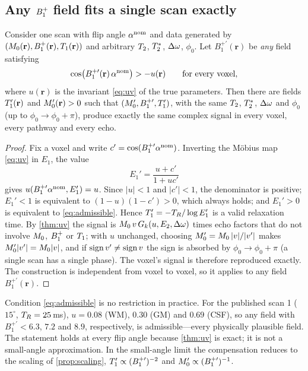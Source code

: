 \subsection{Any $B_1^{+}$ field fits a single scan exactly}

\begin{proposition}\label{prop:singlescan}
Consider one scan with flip angle $\alpha^{\rm nom}$ and data generated by
$(M_0(\mathbf r),B_1^{+}(\mathbf r),T_1(\mathbf r))$ and arbitrary $T_2$, $T_2^{*}$, $\Delta\omega$, $\phi_0$. Let
$B_1^{+\prime}(\mathbf r)$ be \emph{any} field satisfying
\begin{equation}
  \cos\bigl(B_1^{+\prime}(\mathbf r)\,\alpha^{\rm nom}\bigr)>-u(\mathbf r)\qquad\text{for every voxel},
  \label{eq:admissible}
\end{equation}
where $u(\mathbf r)$ is the invariant \eqref{eq:uv} of the true parameters. Then there are fields
$T_1'(\mathbf r)$ and $M_0'(\mathbf r)>0$ such that $(M_0',B_1^{+\prime},T_1')$, with the same $T_2$, $T_2^{*}$, $\Delta\omega$ and
$\phi_0$ (up to $\phi_0\to\phi_0+\pi$), produce exactly the same complex signal in every voxel, every
pathway and every echo.
\end{proposition}
\begin{proof}
Fix a voxel and write $c'=\cos(B_1^{+\prime}\alpha^{\rm nom})$. Inverting the M\"obius map \eqref{eq:uv}
in $E_1$, the value
\[
  E_1'=\frac{u+c'}{1+uc'}
\]
gives $u(B_1^{+\prime}\alpha^{\rm nom},E_1')=u$. Since $|u|<1$ and $|c'|<1$, the denominator is positive;
$E_1'<1$ is equivalent to $(1-u)(1-c')>0$, which always holds; and $E_1'>0$ is equivalent to
\eqref{eq:admissible}. Hence $T_1'=-T_R/\log E_1'$ is a valid relaxation time. By \cref{thm:uv} the
signal is $M_0\,v\,G_k(u,E_2,\Delta\omega)$ times echo factors that do not involve $M_0$, $B_1^{+}$ or $T_1$; with
$u$ unchanged, choosing $M_0'=M_0\,|v|/|v'|$ makes $M_0'|v'|=M_0|v|$, and if $\operatorname{sign} v'\ne\operatorname{sign} v$ the
sign is absorbed by $\phi_0\to\phi_0+\pi$ (a single scan has a single phase). The voxel's signal is
therefore reproduced exactly. The construction is independent from voxel to voxel, so it
applies to any field $B_1^{+\prime}(\mathbf r)$.
\end{proof}

Condition \eqref{eq:admissible} is no restriction in practice. For the published scan 1
($15^\circ$, $T_R=25$\,ms), $u=0.08$ (WM), $0.30$ (GM) and $0.69$ (CSF), so any field with
$B_1^{+\prime}<6.3$, $7.2$ and $8.9$, respectively, is admissible---every physically plausible field.
The statement holds at every flip angle because \cref{thm:uv} is exact; it is not a
small-angle approximation. In the small-angle limit the compensation reduces to the
scaling of \cref{prop:scaling}, $T_1'\propto(B_1^{+\prime})^{-2}$ and $M_0'\propto(B_1^{+\prime})^{-1}$.

